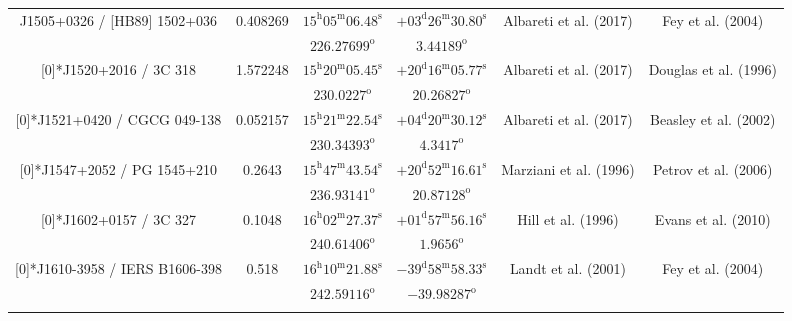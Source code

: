 \begin{landscape}
\begin{longtable}{cccccc}
  \multirow{2}[0]{*}{J1505+0326 / [HB89] 1502+036} & \multirow{2}[0]{*}{0.408269} &  
    $15^\text{h}05^\text{m}06.48^\text{s} $  & $+03^\text{d}26^\text{m}30.80^\text{s} $  & 
    \multirow{2}[0]{*}{Albareti et al. (2017)\cite{RedRef9_2017}}& \multirow{2}[0]{*}{Fey et al. (2004)\cite{CoordRef2_2004}} \\*
    & & $226.27699^\text{o}$ & $3.44189^\text{o}$ & & \\ \addlinespace 
  \multirow{2}[0]{*}{J1520+2016 / 3C 318} & \multirow{2}[0]{*}{1.572248} &  
    $15^\text{h}20^\text{m}05.45^\text{s} $  & $+20^\text{d}16^\text{m}05.77^\text{s} $  & 
    \multirow{2}[0]{*}{Albareti et al. (2017)\cite{RedRef9_2017}}& \multirow{2}[0]{*}{Douglas et al. (1996)\cite{CoordRef10_1996}} \\*
     & & $230.0227^\text{o}$ & $20.26827^\text{o}$ & & \\ \addlinespace 
 \multirow{2}[0]{*}{J1521+0420 / CGCG 049-138} & \multirow{2}[0]{*}{0.052157} &  
    $15^\text{h}21^\text{m}22.54^\text{s}$  & $+04^\text{d}20^\text{m}30.12^\text{s}$  & 
    \multirow{2}[0]{*}{Albareti et al. (2017)\cite{RedRef9_2017}}& \multirow{2}[0]{*}{Beasley et al. (2002)\cite{CoordRef4_2002}} \\*
      & & $230.34393^\text{o}$ & $4.3417^\text{o}$ & & \\ \addlinespace 
 \multirow{2}[0]{*}{J1547+2052 / PG 1545+210} & \multirow{2}[0]{*}{0.2643} &  
    $15^\text{h}47^\text{m}43.54^\text{s}$  & $+20^\text{d}52^\text{m}16.61^\text{s}$  & 
    \multirow{2}[0]{*}{Marziani et al. (1996)\cite{RedRef66_1996}}& \multirow{2}[0]{*}{Petrov et al. (2006)\cite{CoordRef66_2006}} \\*
    & & $236.93141^\text{o}$ & $20.87128^\text{o}$ & & \\ \addlinespace 

 \multirow{2}[0]{*}{J1602+0157 / 3C 327} & \multirow{2}[0]{*}{0.1048} &  
    $16^\text{h}02^\text{m}27.37^\text{s}$  & $+01^\text{d}57^\text{m}56.16^\text{s}$  & 
    \multirow{2}[0]{*}{Hill et al. (1996)\cite{RedRef67_1996}}& \multirow{2}[0]{*}{Evans et al. (2010)\cite{CoordRef1_2010}} \\*
      & & $240.61406^\text{o}$ & $1.9656^\text{o}$ & & \\ \addlinespace 

 \multirow{2}[0]{*}{J1610-3958 / IERS B1606-398} & \multirow{2}[0]{*}{0.518} &  
    $16^\text{h}10^\text{m}21.88^\text{s}$  & $-39^\text{d}58^\text{m}58.33^\text{s}$  & 
    \multirow{2}[0]{*}{Landt et al. (2001)\cite{RedRef68_2001}}& \multirow{2}[0]{*}{Fey et al. (2004)\cite{CoordRef2_2004}} \\*
     & & $242.59116^\text{o}$ & $-39.98287^\text{o}$ & & \\ \addlinespace 


\end{longtable}
\end{landscape}
